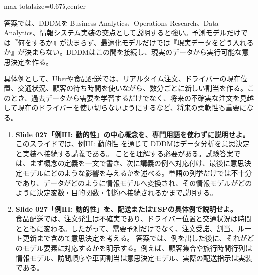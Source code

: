\begin{adjustbox}{max totalsize={\textwidth}{0.675\textheight},center}
\begin{minipage}{\textwidth}
\begin{minipage}[t]{0.485\textwidth}
答案では、DDDMを Business Analytics、Operations Research、Data Analytics、情報システム実装の交点として説明すると強い。予測モデルだけでは『何をするか』が決まらず、最適化モデルだけでは『現実データをどう入れるか』が決まらない。DDDMはこの間を接続し、現実のデータから実行可能な意思決定を作る。\par
具体例として、Uberや食品配送では、リアルタイム注文、ドライバーの現在位置、交通状況、顧客の待ち時間を使いながら、数分ごとに新しい割当を作る。このとき、過去データから需要を学習するだけでなく、将来の不確実な注文を見越して現在のドライバーを使い切らないようにするなど、将来の柔軟性も重要になる。\par
{}
\begin{enumerate}
\item \textbf{Slide 027「例III: 動的性」の中心概念を、専門用語を使わずに説明せよ。}\\このスライドでは、例III: 動的性 を通じて DDDMはデータ分析を意思決定と実装へ接続する講義である。 ことを理解する必要がある。試験答案では、まず概念の定義を一文で書き、次に講義の例へ対応付け、最後に意思決定モデルにどのような影響を与えるかを述べる。単語の列挙だけでは不十分であり、データがどのように情報モデルへ変換され、その情報モデルがどのように決定変数・目的関数・制約へ接続されるかまで説明する。
\item \textbf{Slide 027「例III: 動的性」を、配送またはTSPの具体例で説明せよ。}\\食品配送では、注文発生は不確実であり、ドライバー位置と交通状況は時間とともに変わる。したがって、需要予測だけでなく、注文受諾、割当、ルート更新まで含めて意思決定を考える。 答案では、例を出した後に、それがどのモデル要素に対応するかを明示する。例えば、顧客集合や旅行時間行列は情報モデル、訪問順序や車両割当は意思決定モデル、実際の配送指示は実装である。
\end{enumerate}
\end{minipage}
\end{minipage}
\end{adjustbox}

